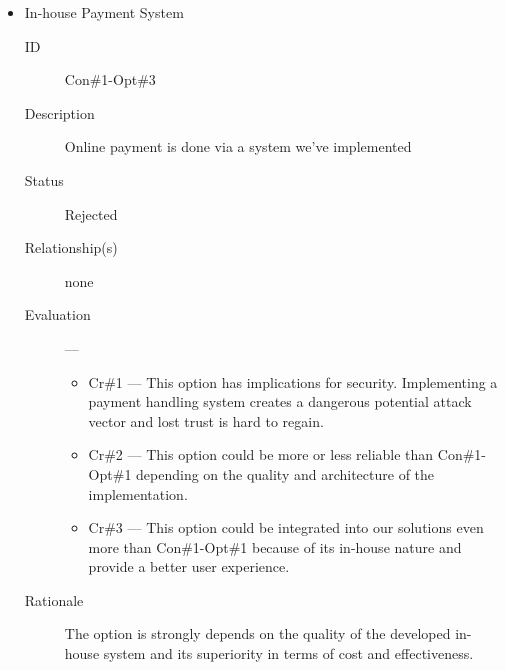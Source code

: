 \documentclass[11pt]{article}
\begin{document}
\begin{itemize}
\item In-house Payment System
\label{sec:org5a0756f}
\begin{description}
\item[{ID}] Con\#1-Opt\#3
\item[{Description}] Online payment is done via a system we've
implemented
\item[{Status}] Rejected
\item[{Relationship(s)}] none
\item[{Evaluation}] ---
\begin{itemize}
\item Cr\#1 --- This option has implications for
security. Implementing a payment handling
system creates a dangerous potential attack
vector and lost trust is hard to regain.
\item Cr\#2 --- This option could be more or less reliable than
Con\#1-Opt\#1 depending on the quality and architecture of the
implementation.
\item Cr\#3 --- This option could be integrated into our solutions
even more than Con\#1-Opt\#1 because of its in-house nature and
provide a better user experience.
\end{itemize}
\item[{Rationale}] The option is strongly depends on the quality of
the developed in-house system and its superiority
in terms of cost and effectiveness.
\end{description}
\end{itemize}
\end{document}
